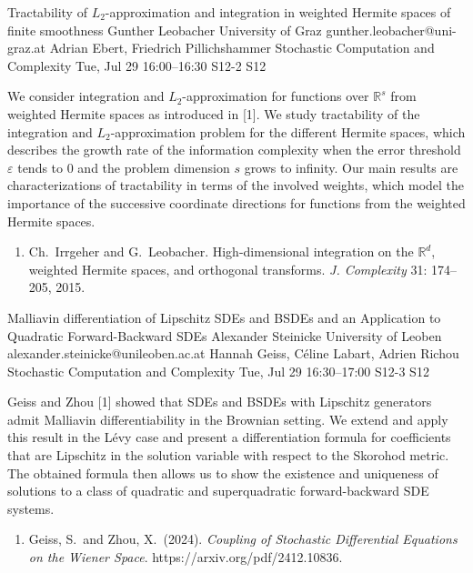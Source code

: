 \documentclass[12pt,lettersize,oneside]{book} %
\begin{document}
\begin{talk}
  {Tractability of $L_2$-approximation and integration in weighted Hermite spaces of finite smoothness}%
  {Gunther Leobacher}%
  {University of Graz}%
  {gunther.leobacher@uni-graz.at}%
  {Adrian Ebert, Friedrich Pillichshammer}%
  {Stochastic Computation and Complexity}%
  {Tue, Jul 29 16:00--16:30}%
  {S12-2}%
  {S12}%
    
   

We consider integration and $L_2$-approximation for functions over $\mathbb R^s$ from weighted Hermite spaces as introduced in [1]. We study tractability of the integration and $L_2$-approximation problem for the different Hermite spaces, which describes the growth rate of the information complexity when the error threshold $\varepsilon$ tends to 0 and the problem dimension $s$ grows to infinity. Our main results are characterizations of tractability in terms of the involved weights, which  model the importance of the successive coordinate directions for functions from the weighted Hermite spaces.

\medskip

\begin{enumerate}
 \item[{[1]}] Ch.~Irrgeher and G.~Leobacher. High-dimensional integration on the $\mathbb R^d$, weighted Hermite spaces, and orthogonal transforms. \textit{J. Complexity} 31: 174--205, 2015. 
\end{enumerate}


\end{talk}

\begin{talk}
  {Malliavin differentiation of Lipschitz SDEs and BSDEs and an Application to Quadratic Forward-Backward SDEs}%
  {Alexander Steinicke}%
  {University of Leoben}%
  {alexander.steinicke@unileoben.ac.at}%
  {Hannah Geiss, C\'eline Labart, Adrien Richou}%
  {Stochastic Computation and Complexity}%
  {Tue, Jul 29 16:30--17:00}%
  {S12-3}%
  {S12}%
    
   
Geiss and Zhou [1] showed that SDEs and BSDEs with Lipschitz generators admit Malliavin differentiability in the Brownian setting. We extend and apply this result in the L\'evy case and present a differentiation formula for coefficients that are Lipschitz in the solution variable with respect to the Skorohod metric. The obtained formula then allows us to show the existence and uniqueness of solutions to a class of quadratic and superquadratic forward-backward SDE systems.

\medskip

\begin{enumerate}
 \item[{[1]}] Geiss, S.~and Zhou, X.~(2024). {\it Coupling of Stochastic Differential Equations on the Wiener Space}. https://arxiv.org/pdf/2412.10836.
\end{enumerate}

\end{talk}
\end{document}
